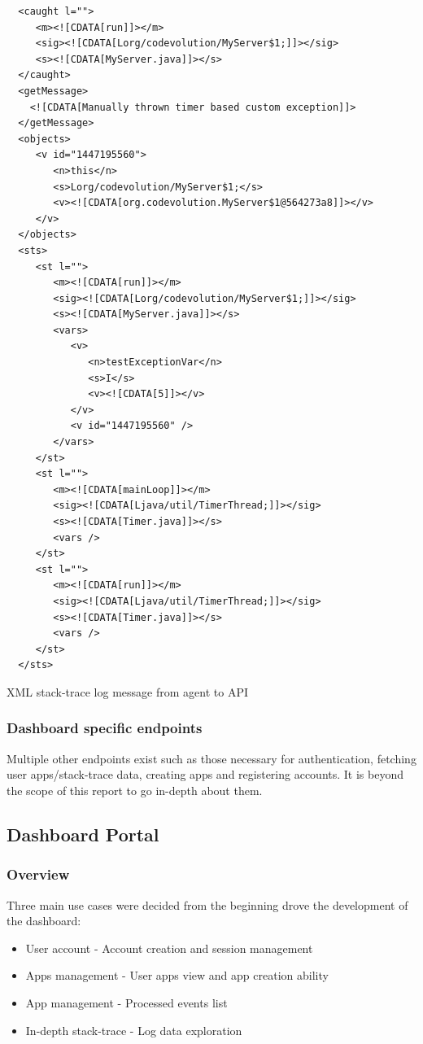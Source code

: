 \begin{listing}[H]
\begin{verbatim}
  <caught l="">
     <m><![CDATA[run]]></m>
     <sig><![CDATA[Lorg/codevolution/MyServer$1;]]></sig>
     <s><![CDATA[MyServer.java]]></s>
  </caught>
  <getMessage>
    <![CDATA[Manually thrown timer based custom exception]]>
  </getMessage>
  <objects>
     <v id="1447195560">
        <n>this</n>
        <s>Lorg/codevolution/MyServer$1;</s>
        <v><![CDATA[org.codevolution.MyServer$1@564273a8]]></v>
     </v>
  </objects>
  <sts>
     <st l="">
        <m><![CDATA[run]]></m>
        <sig><![CDATA[Lorg/codevolution/MyServer$1;]]></sig>
        <s><![CDATA[MyServer.java]]></s>
        <vars>
           <v>
              <n>testExceptionVar</n>
              <s>I</s>
              <v><![CDATA[5]]></v>
           </v>
           <v id="1447195560" />
        </vars>
     </st>
     <st l="">
        <m><![CDATA[mainLoop]]></m>
        <sig><![CDATA[Ljava/util/TimerThread;]]></sig>
        <s><![CDATA[Timer.java]]></s>
        <vars />
     </st>
     <st l="">
        <m><![CDATA[run]]></m>
        <sig><![CDATA[Ljava/util/TimerThread;]]></sig>
        <s><![CDATA[Timer.java]]></s>
        <vars />
     </st>
  </sts>
\end{verbatim}
\caption{XML stack-trace log message from agent to API}
\end{listing}




\subsubsection{Dashboard specific endpoints}

Multiple other endpoints exist such as those necessary for authentication, fetching user apps/stack-trace data, creating apps and registering accounts. It is beyond the scope of this report to go in-depth about them.

\subsection{Dashboard Portal}
\subsubsection{Overview}
Three main use cases were decided from the beginning drove the development of the dashboard:

\begin{itemize}
  \item User account - Account creation and session management
  \item Apps management - User apps view and app creation ability
  \item App management - Processed events list
  \item In-depth stack-trace - Log data exploration  
\end{itemize}

